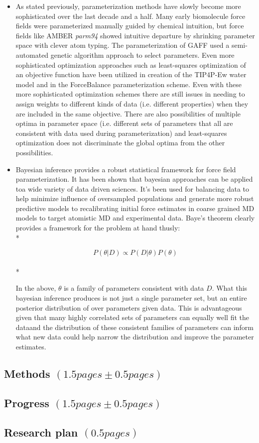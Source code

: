 \documentclass[aps,pre,onecolumn,nofootinbib,superscriptaddress,linenumbers,12pt, draft,tightenlines]{revtex4-1}
\begin{document}
\begin{itemize}
 \item As stated previously, parameterization methods have slowly become more sophisticated over the last decade and a half. Many early biomolecule force fields were parameterized manually guided by chemical intuition, but force fields like AMBER \textit{parm94} showed intuitive departure by shrinking parameter space with clever atom typing.\cite{parm94} The parameterization of GAFF used a semi-automated genetic algorithm approach to select parameters.\cite{amber} Even more sophisticated optimization approaches such as least-squares optimization of an objective function have been utilized in creation of the TIP4P-Ew water model\cite{tip4pew} and in the ForceBalance parameterization scheme\cite{FB1,FB2,FB3}. Even with these more sophisticated optimization schemes there are still issues in needing to assign weights to different kinds of data (i.e. different properties) when they are included in the same objective. There are also possibilities of multiple optima in parameter space (i.e. different sets of parameters that all are consistent with data used during parameterization) and least-squares optimization does not discriminate the global optima from the other possibilities.           
 \item Bayesian inference provides a robust statistical framework for force field parameterization. It has been shown that bayesian approaches can be applied toa wide variety of data driven sciences. It's been used for balancing data to help minimize influence of oversampled populations and generate more robust predictive models\cite{bayes_imbalance} to recalibrating initial force estimates in coarse grained MD models to target atomistic MD and experimental data\cite{bayes_coarse}. Baye's theorem clearly provides a framework for the problem at hand thusly:\\*

\begin{equation} P\left(\theta|D\right) \propto P\left(D|\theta\right) P\left(\theta\right)\end{equation}\\*

In the above, $\theta$ is a family of parameters consistent with data $D$. What this bayesian inference produces is not just a single parameter set, but an entire posterior distribution of over parameters given data. This is advantageous given that many highly correlated sets of parameters can equally well fit the dataand the distribution of these consistent families of parameters can inform what new data could help narrow the distribution and improve the parameter estimates.   
\end{itemize}

\subsection{Methods $\left(1.5 pages \pm 0.5 pages\right)$}

\subsection{Progress $\left(1.5 pages \pm 0.5 pages\right)$}

\subsection{Research plan $\left(0.5 pages\right)$}



\end{document}
